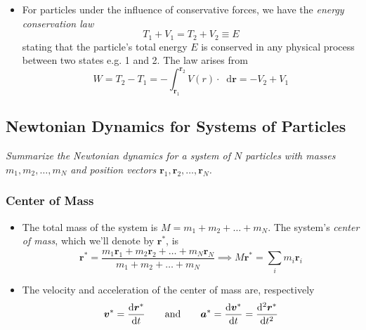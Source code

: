\documentclass[11pt, a4paper]{article}
\newcommand{\eqtext}[1]{\qquad \text{#1} \qquad}
\newcommand{\diff}{\mathop{}\!\mathrm{d}} %
\begin{document}
\begin{itemize}
	\item For particles under the influence of conservative forces, we have the \textit{energy conservation law}
	\begin{equation*}
		T_1 + V_1 = T_2 + V_2 \equiv E
	\end{equation*}
	stating that the particle's total energy $ E $ is conserved in any physical process between two states e.g. 1 and 2. The law arises from
	\begin{equation*}
		W = T_2 - T_1 = - \int_{\bm{r}_1}^{\bm{r}_2} V(r) \cdot \diff \bm{r} = -V_2 + V_1
	\end{equation*}
\end{itemize}

\subsection{Newtonian Dynamics for Systems of Particles}
\textit{Summarize the Newtonian dynamics for a system of $ N $ particles with masses $ m_1, m_2, \dots, m_N$ and position vectors $ \bm{r}_1, \bm{r}_2, \dots, \bm{r}_{N} $.}

\subsubsection{Center of Mass}

\begin{itemize}
	\item The total mass of the system is $ M =  m_1 + m_2 + \dots + m_N$. The system's \textit{center of mass}, which we'll denote by $ \bm{r}^* $, is
	\begin{equation*}	
		\bm{r}^* = \frac{m_1 \bm{r}_1 + m_2 \bm{r}_2 + \dots + m_N \bm{r}_N }{m_1 + m_2 + \dots + m_N} \implies M \bm{r}^{*} = \sum_{i}m_{i}\bm{r}_{i}
	\end{equation*}
	
	\item The velocity and acceleration of the center of mass are, respectively
	\begin{equation*}
		\bm{v}^* = \dv{\bm{r}^*}{t} \eqtext{and} \bm{a}^* = \dv{\bm{v}^*}{t} = \dv[2]{\bm{r}^*}{t}
	\end{equation*}
	
\end{itemize}
\end{document}
